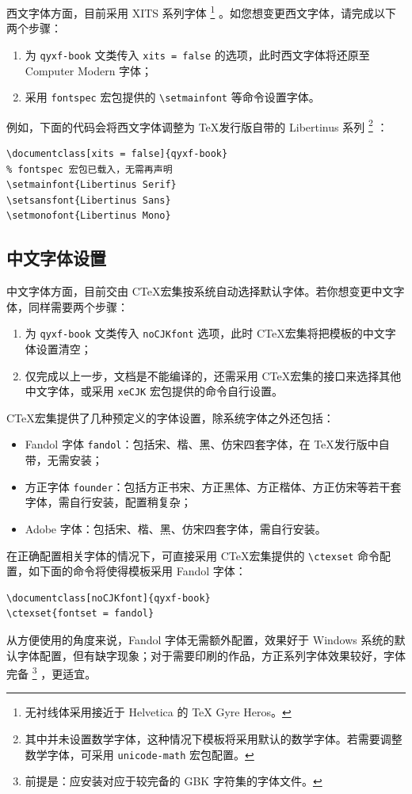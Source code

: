 \documentclass[
  10pt,
  twoside,
  openany,
  b5paper, %
  colorscheme = basic %
]{qyxf-book}
\begin{document}
西文字体方面，目前采用 XITS 系列字体
\footnote{无衬线体采用接近于 Helvetica 的 \TeX{} Gyre Heros。}
。如您想变更西文字体，请完成以下两个步骤：

\begin{enumerate}
  \item 为 \verb|qyxf-book| 文类传入 \verb|xits = false| 的选项，此时西文字体将还原至 Computer Modern 字体；
  \item 采用 \verb|fontspec| 宏包提供的 \verb|\setmainfont| 等命令设置字体。
\end{enumerate}

例如，下面的代码会将西文字体调整为 \TeX 发行版自带的 Libertinus 系列
\footnote{其中并未设置数学字体，这种情况下模板将采用默认的数学字体。若需要调整数学字体，可采用 \texttt{unicode-math} 宏包配置。}
：

\begin{tcolorbox}
\begin{verbatim}
\documentclass[xits = false]{qyxf-book}
% fontspec 宏包已载入，无需再声明
\setmainfont{Libertinus Serif}
\setsansfont{Libertinus Sans}
\setmonofont{Libertinus Mono}
\end{verbatim}
\end{tcolorbox}

\subsection{中文字体设置}

中文字体方面，目前交由 C\TeX 宏集按系统自动选择默认字体。若你想变更中文字体，同样需要两个步骤：

\begin{enumerate}
  \item 为 \verb|qyxf-book| 文类传入 \verb|noCJKfont| 选项，此时 C\TeX 宏集将把模板的中文字体设置清空；
  \item 仅完成以上一步，文档是不能编译的，还需采用 C\TeX 宏集的接口来选择其他中文字体，或采用 \verb|xeCJK| 宏包提供的命令自行设置。
\end{enumerate}

C\TeX 宏集提供了几种预定义的字体设置，除系统字体之外还包括：
\begin{itemize}
  \item Fandol 字体 \verb|fandol|：包括宋、楷、黑、仿宋四套字体，在 \TeX 发行版中自带，无需安装；
  \item 方正字体 \verb|founder|：包括方正书宋、方正黑体、方正楷体、方正仿宋等若干套字体，需自行安装，配置稍复杂；
  \item Adobe 字体：包括宋、楷、黑、仿宋四套字体，需自行安装。
\end{itemize}
在正确配置相关字体的情况下，可直接采用 C\TeX 宏集提供的 \verb|\ctexset| 命令配置，如下面的命令将使得模板采用 Fandol 字体：
\begin{tcolorbox}
\begin{verbatim}
\documentclass[noCJKfont]{qyxf-book}
\ctexset{fontset = fandol}
\end{verbatim}
\end{tcolorbox}
从方便使用的角度来说，Fandol 字体无需额外配置，效果好于 Windows 系统的默认字体配置，但有缺字现象；对于需要印刷的作品，方正系列字体效果较好，字体完备
\footnote{前提是：应安装对应于较完备的 GBK 字符集的字体文件。}
，更适宜。
\end{document}

